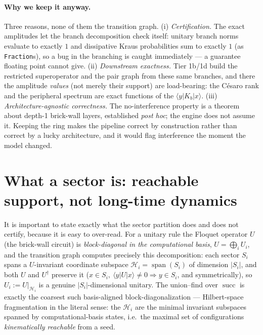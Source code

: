 \documentclass[11pt]{article}
\newcommand{\rt}[1]{\texttt{#1}}
\begin{document}
\paragraph{Why we keep it anyway.} Three reasons, none of them the transition
graph. (i) \emph{Certification.} The exact amplitudes let the branch
decomposition check itself: unitary branch norms evaluate to exactly $1$ and
dissipative Kraus probabilities sum to exactly $1$ (as \rt{Fraction}s), so a bug
in the branching is caught immediately --- a guarantee floating point cannot give.
(ii) \emph{Downstream exactness.} Tier 1b/1d build the restricted superoperator
and the pair graph from these same branches, and there the amplitude
\emph{values} (not merely their support) are load-bearing: the C\'esaro rank and
the peripheral spectrum are exact functions of the $\langle y|K_b|x\rangle$. (iii)
\emph{Architecture-agnostic correctness.} The no-interference property is a
theorem about depth-1 brick-wall layers, established \emph{post hoc}; the engine
does not assume it. Keeping the ring makes the pipeline correct by construction
rather than correct by a lucky architecture, and it would flag interference the
moment the model changed.

\section{What a sector is: reachable support, not long-time dynamics}
\label{sec:meaning}
It is important to state exactly what the sector partition does and does not
certify, because it is easy to over-read. For a unitary rule the Floquet operator
$U$ (the brick-wall circuit) is \emph{block-diagonal in the computational basis},
$U=\bigoplus_i U_i$, and the transition graph computes precisely this
decomposition: each sector $S_i$ spans a $U$-invariant coordinate subspace
$\mathcal H_i=\operatorname{span}(S_i)$ of dimension $|S_i|$, and both $U$ and
$U^\dagger$ preserve it ($x\in S_i,\ \langle y|U|x\rangle\neq0\Rightarrow y\in
S_i$, and symmetrically), so $U_i:=U|_{\mathcal H_i}$ is a genuine
$|S_i|$-dimensional unitary. The union--find over $\operatorname{succ}$ is exactly
the coarsest such basis-aligned block-diagonalization --- Hilbert-space
fragmentation in the literal sense: the $\mathcal H_i$ are the minimal invariant
subspaces spanned by computational-basis states, i.e.\ the maximal set of
configurations \emph{kinematically reachable} from a seed.
\end{document}
